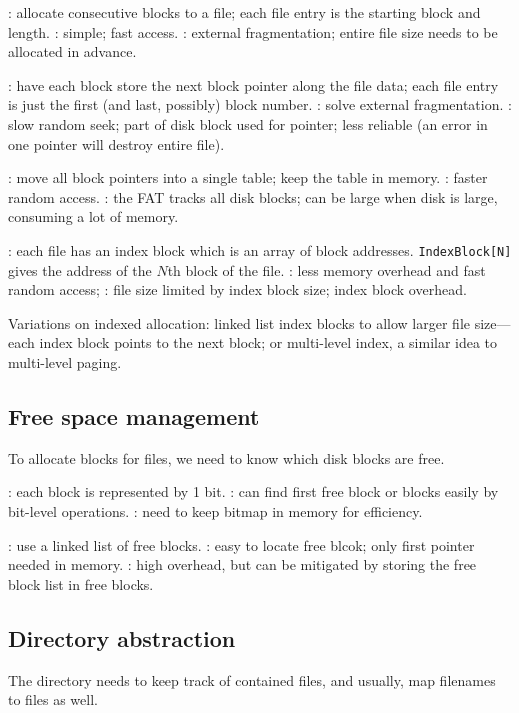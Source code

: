 \documentclass[fontsize=9pt,twoside]{slnotes}
\newcommand\benefits{\checkmark}
\newcommand\problems{\textsymbol{✗}}
\begin{document}
: allocate consecutive blocks to a file; each file entry is the starting block and length. \benefits: simple; fast access. \problems: external fragmentation; entire file size needs to be allocated in advance.

: have each block store the next block pointer along the file data; each file entry is just the first (and last, possibly) block number. \benefits: solve external fragmentation. \problems: slow random seek; part of disk block used for pointer; less reliable (an error in one pointer will destroy entire file).

: move all block pointers into a single table; keep the table in memory. \benefits: faster random access. \problems: the FAT tracks all disk blocks; can be large when disk is large, consuming a lot of memory.

: each file has an index block which is an array of block addresses. \texttt{Index\-Block[N]} gives the address of the \(N\)th block of the file. \benefits: less memory overhead and fast random access; \problems: file size limited by index block size; index block overhead.

Variations on indexed allocation: linked list index blocks to allow larger file size---each index block points to the next block; or multi-level index, a similar idea to multi-level paging.

\subsection{Free space management}
To allocate blocks for files, we need to know which disk blocks are free.

: each block is represented by 1 bit. \benefits: can find first free block or blocks easily by bit-level operations. \problems: need to keep bitmap in memory for efficiency.

: use a linked list of free blocks. \benefits: easy to locate free blcok; only first pointer needed in memory. \problems: high overhead, but can be mitigated by storing the free block list in free blocks.

\subsection{Directory abstraction}
The directory needs to keep track of contained files, and usually, map filenames to files as well.
\end{document}
